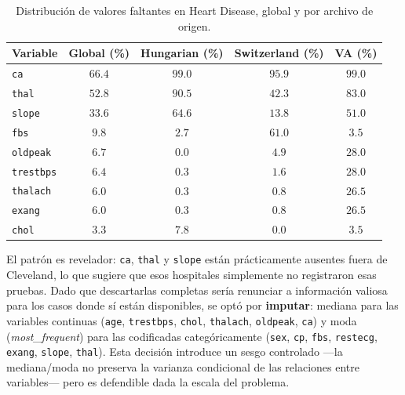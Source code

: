 \begin{table}[H]
    \centering
    \begin{tabular}{lcccc}
        \toprule
        \rowcolor{headerblue}
        \textcolor{headertext}{\textbf{Variable}}         &
        \textcolor{headertext}{\textbf{Global (\%)}}      &
        \textcolor{headertext}{\textbf{Hungarian (\%)}}   &
        \textcolor{headertext}{\textbf{Switzerland (\%)}} &
        \textcolor{headertext}{\textbf{VA (\%)}}                                              \\
        \midrule
        \texttt{ca}                                       & $66.4$ & $99.0$ & $95.9$ & $99.0$ \\
        \texttt{thal}                                     & $52.8$ & $90.5$ & $42.3$ & $83.0$ \\
        \texttt{slope}                                    & $33.6$ & $64.6$ & $13.8$ & $51.0$ \\
        \texttt{fbs}                                      & $9.8$  & $2.7$  & $61.0$ & $3.5$  \\
        \texttt{oldpeak}                                  & $6.7$  & $0.0$  & $4.9$  & $28.0$ \\
        \texttt{trestbps}                                 & $6.4$  & $0.3$  & $1.6$  & $28.0$ \\
        \texttt{thalach}                                  & $6.0$  & $0.3$  & $0.8$  & $26.5$ \\
        \texttt{exang}                                    & $6.0$  & $0.3$  & $0.8$  & $26.5$ \\
        \texttt{chol}                                     & $3.3$  & $7.8$  & $0.0$  & $3.5$  \\
        \bottomrule
    \end{tabular}
    \caption{Distribución de valores faltantes en Heart Disease, global y
        por archivo de origen.}
    \label{tab:heart-faltantes}
\end{table}

El patrón es revelador: \texttt{ca}, \texttt{thal} y \texttt{slope} están
prácticamente ausentes fuera de Cleveland, lo que sugiere que esos
hospitales simplemente no registraron esas pruebas. Dado que descartarlas
completas sería renunciar a información valiosa para los casos donde
sí están disponibles, se optó por \textbf{imputar}: mediana para las
variables continuas (\texttt{age}, \texttt{trestbps}, \texttt{chol},
\texttt{thalach}, \texttt{oldpeak}, \texttt{ca}) y moda
(\textit{most\_frequent}) para las codificadas categóricamente
(\texttt{sex}, \texttt{cp}, \texttt{fbs}, \texttt{restecg},
\texttt{exang}, \texttt{slope}, \texttt{thal}). Esta decisión introduce un
sesgo controlado ---la mediana/moda no preserva la varianza condicional
de las relaciones entre variables--- pero es defendible dada la escala
del problema.

